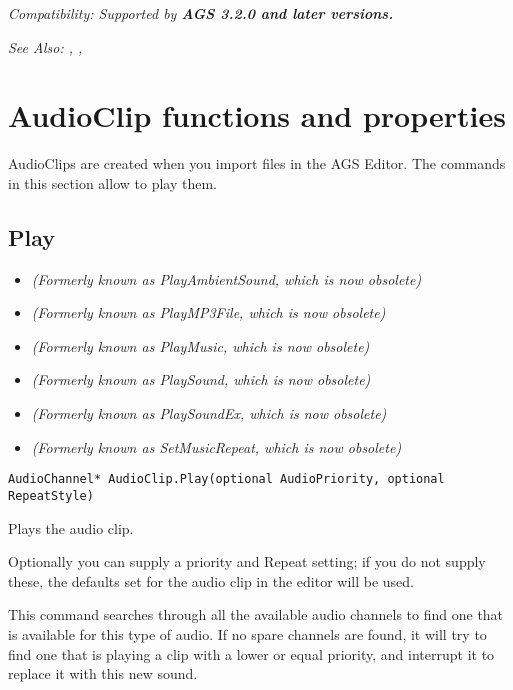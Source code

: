 \it{Compatibility:} Supported by \bf{AGS 3.2.0} and later versions.

\it{See Also:} ,
, 


\section{AudioClip functions and properties}\label{AudioClipCommands}%

AudioClips are created when you import files in the AGS Editor. The commands in this
section allow to play them.


\subsection{Play}\label{AudioClip.Play}%

\begin{itemize}
\item \it{(Formerly known as PlayAmbientSound, which is now obsolete)}
\item \it{(Formerly known as PlayMP3File, which is now obsolete)}
\item \it{(Formerly known as PlayMusic, which is now obsolete)}
\item \it{(Formerly known as PlaySound, which is now obsolete)}
\item \it{(Formerly known as PlaySoundEx, which is now obsolete)}
\item \it{(Formerly known as SetMusicRepeat, which is now obsolete)}
\end{itemize}

\begin{verbatim}
AudioChannel* AudioClip.Play(optional AudioPriority, optional RepeatStyle)
\end{verbatim}
Plays the audio clip.

Optionally you can supply a priority and Repeat setting; if you do not supply these,
the defaults set for the audio clip in the editor will be used.

This command searches through all the available audio channels to find one that is
available for this type of audio. If no spare channels are found, it will try to find
one that is playing a clip with a lower or equal priority, and interrupt it to replace
it with this new sound.

